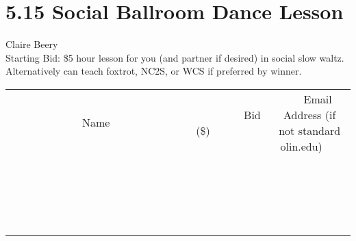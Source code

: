 \documentclass[11pt]{article}
\begin{document}
\section*{5.15 Social Ballroom Dance Lesson}
Claire Beery
\\
Starting Bid: \$5
 hour lesson for you (and partner if desired) in social slow waltz. Alternatively can teach foxtrot, NC2S, or WCS if preferred by winner.
\\[3ex]
\begin{tabular}{c c c}
~~~~~~~~~~~~~Name~~~~~~~~~~~~~ & ~~~~~~~~~Bid (\$)~~~~~~~~~  & ~~~Email Address (if not standard olin.edu)~~~\\
 & & \\
\hline
 & & \\
\hline
 & & \\
\hline
 & & \\
\hline
 & & \\
\hline
 & & \\
\hline
 & & \\
\hline
 & & \\
\hline
 & & \\
\hline
 & & \\
\hline
 & & \\
\hline
 & & \\
\hline
 & & \\
\hline
 & & \\
\hline
 & & \\
\hline
 & & \\
\hline
 & & \\
\hline
 & & \\
\hline
 & & \\
\hline
\end{tabular}
\newpage
\end{document}
